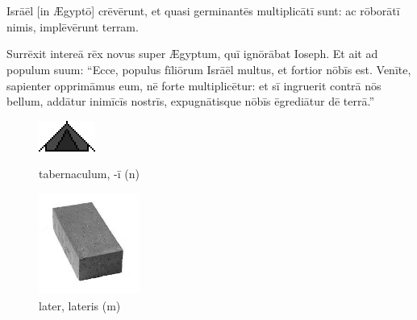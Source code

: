 \chapter{}


\thispagestyle{empty}


 Isrāēl [in Ægyptō] crēvērunt, et quasi germinantēs multiplicātī sunt:
ac rōborātī nimis, implēvērunt terram.

Surrēxit intereā rēx novus super Ægyptum, quī ignōrābat Ioseph.
Et ait ad populum suum: ``Ecce, populus fīliōrum Isrāēl multus, et fortior nōbīs est.
Venīte, sapien\-ter opprimāmus eum, nē forte multiplicētur: et sī ingruerit contrā nōs bellum, addātur inimīcīs nostrīs, expugnātisque nōbīs ēgrediātur dē terrā.''

\begin{figure}[h]
    \begin{minipage}[h]{0.5\linewidth}
        \centering
        \includegraphics{tab}
        \caption{tabernaculum, -ī (n)}
    \end{minipage}%
    \begin{minipage}[h]{0.5\linewidth}
        \vspace*{-0.3cm}
        \centering
        \includegraphics{later}
        \vspace*{-0.425cm}
        \caption{later, lateris (m)}
    \end{minipage}
\end{figure}


